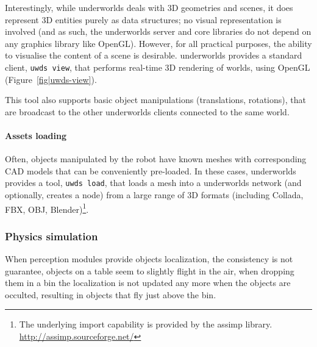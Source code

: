 \documentclass[letterpaper, 10pt, conference]{ieeeconf}
\newcommand{\eg}{e.g.,\xspace}
\newcommand{\uwds}{{\sc underworlds}\xspace}
\begin{document}
Interestingly, while \uwds deals with 3D geometries and scenes, it does
represent 3D entities purely as data structures; no visual representation is
involved (and as such, the \uwds server and core libraries do not depend on any
graphics library like OpenGL). However, for all practical purposes, the ability
to visualise the content of a scene is desirable. \uwds provides a standard
client, {\tt uwds view}, that performs real-time 3D rendering of worlds,
using OpenGL (Figure~\ref{fig|uwds-view}).

This tool also supports basic object manipulations (translations, rotations),
that are broadcast to the other \uwds clients connected to the same world.

\paragraph*{Assets loading}


Often, objects manipulated by the robot have known meshes with corresponding CAD
models that can be conveniently pre-loaded. In these cases, \uwds provides a
tool, {\tt uwds load}, that loads a mesh into a \uwds network (and optionally,
creates a node) from a large range of 3D formats (including Collada, FBX, OBJ,
Blender)\footnote{The underlying import
capability is provided by the {\sc assimp} library.
\url{http://assimp.sourceforge.net/}}.

\subsubsection{Physics simulation}\label{physics}

When perception modules provide objects localization, the consistency is not guarantee, objects on a table seem to slightly flight in the air, when dropping them in a bin the localization is not updated any more when the objects are occulted, resulting in objects that fly just above the bin.
\end{document}
